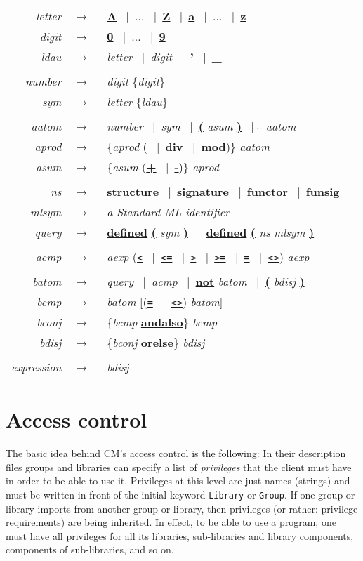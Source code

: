 \documentclass{article}
\newcommand{\nt}[1]{{\it #1}}
\newcommand{\tl}[1]{{\underline{\bf #1}}}
\newcommand{\ttl}[1]{{\underline{\tt #1}}}
\newcommand{\ar}{$\rightarrow$\ }
\newcommand{\vb}{~$|$~}
\begin{document}
\begin{tabular}{rcl}
\nt{letter} &\ar& \tl{A} \vb $\ldots$ \vb \tl{Z} \vb \tl{a} \vb $\ldots$ \vb \tl{z} \\
\nt{digit}  &\ar& \tl{0} \vb $\ldots$ \vb \tl{9} \\
\nt{ldau}   &\ar& \nt{letter} \vb \nt{digit} \vb \tl{'} \vb \tl{\_} \\
\\
\nt{number} &\ar& \nt{digit} \{\nt{digit}\} \\
\nt{sym}    &\ar& \nt{letter} \{\nt{ldau}\} \\
\\
\nt{aatom}  &\ar& \nt{number} \vb \nt{sym} \vb \tl{(} \nt{asum} \tl{)} \vb \tl{$\tilde{~}$} \nt{aatom} \\
\nt{aprod}  &\ar& \{\nt{aprod} (\tl{*} \vb \tl{div} \vb \tl{mod})\} \nt{aatom} \\
\nt{asum}   &\ar& \{\nt{asum} (\tl{+} \vb \tl{-})\} \nt{aprod} \\
\\
\nt{ns}     &\ar& \tl{structure} \vb \tl{signature} \vb \tl{functor} \vb \tl{funsig} \\
\nt{mlsym}  &\ar& {\em a Standard ML identifier} \\
\nt{query}  &\ar& \tl{defined} \tl{(} \nt{sym} \tl{)} \vb \tl{defined} \tl{(} \nt{ns} \nt{mlsym} \tl{)} \\
\\
\nt{acmp}   &\ar& \nt{aexp} (\ttl{<} \vb \ttl{<=} \vb \ttl{>} \vb \ttl{>=} \vb \ttl{=} \vb \ttl{<>}) \nt{aexp} \\
\\
\nt{batom}  &\ar& \nt{query} \vb \nt{acmp} \vb \tl{not} \nt{batom} \vb \tl{(} \nt{bdisj} \tl{)} \\
\nt{bcmp}   &\ar& \nt{batom} [(\ttl{=} \vb \ttl{<>}) \nt{batom}] \\
\nt{bconj}  &\ar& \{\nt{bcmp} \tl{andalso}\} \nt{bcmp} \\
\nt{bdisj}  &\ar& \{\nt{bconj} \tl{orelse}\} \nt{bdisj} \\
\\
\nt{expression} &\ar& \nt{bdisj}
\end{tabular}

\section{Access control}
\label{sec:access}

The basic idea behind CM's access control is the following: In their
description files groups and libraries can specify a list of
{\em privileges} that the client must have in order to be able to use it.
Privileges at this level are just names (strings) and must be written
in front of the initial keyword {\tt Library} or {\tt Group}.  If one
group or library imports from another group or library, then
privileges (or rather: privilege requirements) are being inherited.
In effect, to be able to use a program, one must have all privileges
for all its libraries, sub-libraries and library components,
components of sub-libraries, and so on.
\end{document}

